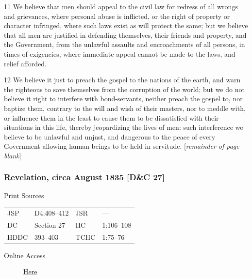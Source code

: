 				11 We believe that men should appeal to the civil law for redress of all wrongs and grievances, where personal abuse is inflicted, or the right of property or character infringed, where such laws exist as will protect the same; but we believe that all men are justified in defending themselves, their friends and property, and the Government, from the unlawful assaults and encroachments of all persons, in times of exigencies, where immediate appeal cannot be made to the laws, and relief afforded.

				12 We believe it just to preach the gospel to the nations of the earth, and warn the righteous to save themselves from the corruption of the world; but we do not believe it right to interfere with bond-servants, neither preach the gospel to, nor baptize them, contrary to the will and wish of their masters, nor to meddle with, or influence them in the least to cause them to be dissatisfied with their situations in this life, thereby jeopardizing the lives of men: such interference we believe to be unlawful and unjust, and dangerous to the peace of every Government allowing human beings to be held in servitude. [\textit{remainder of page blank}]

		\subsubsection{Revelation, circa August 1835 [D\&C 27]}
			\label{EMS-1835-JS-CIR-AUG-1835}
			
			\begin{description}
				\item[Print Sources]
			\end{description}

				\begin{tabular}{p{0.5in}p{1in}p{0.5in}p{1in}}
				JSP	 	& D4:408--412		& JSR 		& --- \\
				DC	 	& Section 27 		& HC 		& 1:106--108 \\
				HDDC 	& 393--403			& TCHC 		& 1:75--76 \\
				\end{tabular}
			
			\begin{description}
				\item[Online Access] \href{https://www.josephsmithpapers.org/paper-summary/revelation-circa-august-1835-dc-27/1}{Here}
			\end{description}
			
